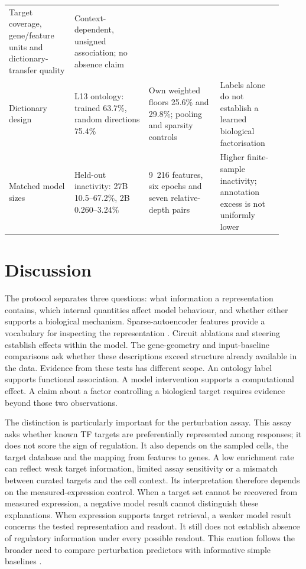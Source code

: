 \documentclass[review,authoryear,12pt]{elsarticle}
\begin{document}
\begin{table}[htbp]
\begin{tabular}{@{}L{0.22\linewidth}L{0.25\linewidth}L{0.24\linewidth}L{0.21\linewidth}@{}}
Target coverage, gene/feature units and dictionary-transfer quality & Context-dependent,
unsigned association; no absence claim \\
Dictionary design & L13 ontology: trained 63.7\%, random directions 75.4\% &
Own weighted floors 25.6\% and 29.8\%; pooling and sparsity controls & Labels alone do not
establish a learned biological factorisation \\
Matched model sizes & Held-out inactivity: 27B 10.5--67.2\%, 2B 0.260--3.24\% &
9~216 features, six epochs and seven relative-depth pairs & Higher finite-sample inactivity;
annotation excess is not uniformly lower \\
\bottomrule
\end{tabular}
\end{table}

\section{Discussion}

The protocol separates three questions: what information a representation contains, which internal
quantities affect model behaviour, and whether either supports a biological mechanism.
Sparse-autoencoder features provide a vocabulary for inspecting the representation
\citep{ref17,ref18,ref19}. Circuit ablations and steering establish effects within the model.
The gene-geometry and input-baseline comparisons ask whether these descriptions exceed structure
already available in the data. Evidence from these tests has different scope. An ontology label
supports functional association. A model intervention supports a computational effect. A claim about
a factor controlling a biological target requires evidence beyond those two observations.

The distinction is particularly important for the perturbation assay. This assay asks whether known
TF targets are preferentially represented among responses; it does not score the sign of regulation.
It also depends on the sampled cells, the target database and the mapping from features to genes.
A low enrichment rate can reflect weak target information, limited assay sensitivity or a mismatch
between curated targets and the cell context. Its interpretation therefore depends on the
measured-expression control. When a target set cannot be recovered from measured expression, a
negative model result cannot distinguish these explanations. When expression supports target
retrieval, a weaker model result concerns the tested representation and readout. It still does not
establish absence of regulatory information under every possible readout. This caution follows the
broader need to compare perturbation predictors with informative simple baselines
\citep{refPerturbBaselines,ref5}.
\end{document}

